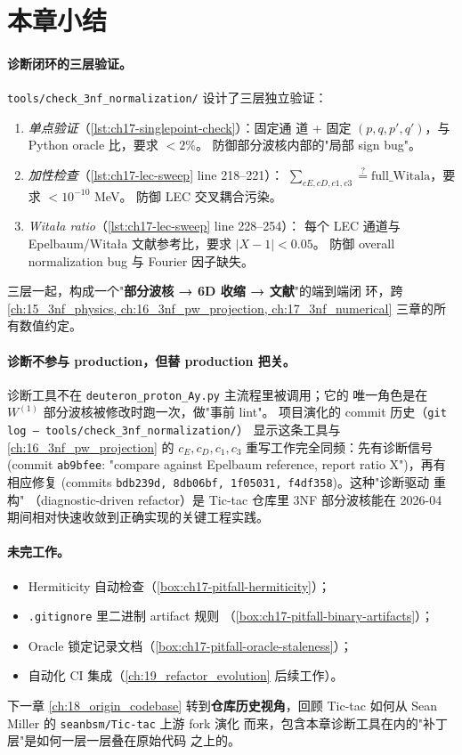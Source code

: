 \section{本章小结}
\label{sec:ch17-summary}

\paragraph{诊断闭环的三层验证。}
\texttt{tools/check\_3nf\_normalization/} 设计了三层独立验证：

\begin{enumerate}
  \item \emph{单点验证}（\cref{lst:ch17-singlepoint-check}）：固定通
        道 + 固定 \((p, q, p', q')\)，与 Python oracle 比，要求 \(<2\%\)。
        防御部分波核内部的"局部 sign bug"。
  \item \emph{加性检查}（\cref{lst:ch17-lec-sweep} line 218--221）：
        \(\sum_{cE,cD,c1,c3} \stackrel{?}{=} \text{full\_Witala}\)，要求 \(<10^{-10}\) MeV。
        防御 LEC 交叉耦合污染。
  \item \emph{Witała ratio}（\cref{lst:ch17-lec-sweep} line 228--254）：
        每个 LEC 通道与 Epelbaum/Witała 文献参考比，要求 \(|X-1| < 0.05\)。
        防御 overall normalization bug 与 Fourier 因子缺失。
\end{enumerate}

三层一起，构成一个"\textbf{部分波核 → 6D 收缩 → 文献}"的端到端闭
环，跨 \cref{ch:15_3nf_physics, ch:16_3nf_pw_projection, ch:17_3nf_numerical}
三章的所有数值约定。

\paragraph{诊断不参与 production，但替 production 把关。}
诊断工具不在 \texttt{deuteron\_proton\_Ay.py} 主流程里被调用；它的
唯一角色是在 \(W^{(1)}\) 部分波核被修改时跑一次，做"事前 lint"。
项目演化的 commit 历史（\texttt{git log -- tools/check\_3nf\_normalization/}）
显示这条工具与 \cref{ch:16_3nf_pw_projection} 的 \(c_E, c_D, c_1, c_3\)
重写工作完全同频：先有诊断信号 (commit \texttt{ab9bfee}: "compare
against Epelbaum reference, report ratio X")，再有相应修复 (commits
\texttt{bdb239d, 8db06bf, 1f05031, f4df358})。这种"诊断驱动 重构"
（diagnostic-driven refactor）是 Tic-tac 仓库里 3NF 部分波核能在
2026-04 期间相对快速收敛到正确实现的关键工程实践。

\paragraph{未完工作。}
\begin{itemize}
  \item Hermiticity 自动检查（\cref{box:ch17-pitfall-hermiticity}）；
  \item \texttt{.gitignore} 里二进制 artifact 规则
        （\cref{box:ch17-pitfall-binary-artifacts}）；
  \item Oracle 锁定记录文档（\cref{box:ch17-pitfall-oracle-staleness}）；
  \item 自动化 CI 集成（\cref{ch:19_refactor_evolution} 后续工作）。
\end{itemize}

下一章 \cref{ch:18_origin_codebase} 转到\textbf{仓库历史视角}，回顾
Tic-tac 如何从 Sean Miller 的 \texttt{seanbsm/Tic-tac} 上游 fork 演化
而来，包含本章诊断工具在内的"补丁层"是如何一层一层叠在原始代码
之上的。
